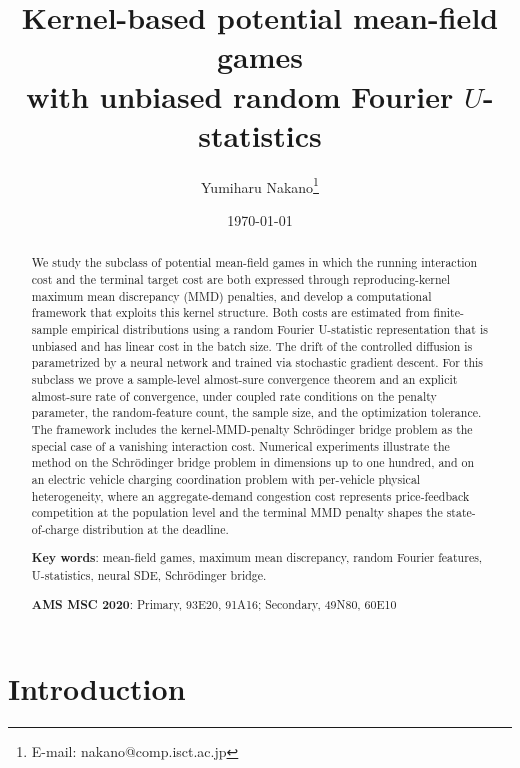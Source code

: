 \documentclass[11pt,leqno]{article}
\title{Kernel-based potential mean-field games \\ with unbiased random Fourier $U$-statistics}
\author[1]{Yumiharu Nakano\thanks{E-mail: nakano@comp.isct.ac.jp}}
\affil[1]{Department of Mathematical and Computing Science,
            Institute of Science Tokyo}
\date{\today}
\theoremstyle{plain}
\theoremstyle{remark}
\theoremstyle{definition}
\numberwithin{equation}{section}
\numberwithin{figure}{section}
\numberwithin{table}{section}
\numberwithin{algorithm}{section}
\begin{document}
\maketitle

\begin{abstract}
We study the subclass of potential mean-field games
in which the running interaction cost and the terminal target cost are both expressed
through reproducing-kernel maximum mean discrepancy (MMD) penalties,
and develop a computational framework that exploits this kernel structure.
Both costs are estimated from finite-sample empirical distributions
using a random Fourier U-statistic representation that is unbiased
and has linear cost in the batch size.
The drift of the controlled diffusion is parametrized by a neural network
and trained via stochastic gradient descent.
For this subclass we prove a sample-level almost-sure convergence theorem
and an explicit almost-sure rate of convergence,
under coupled rate conditions on the penalty parameter, the random-feature count, the sample size,
and the optimization tolerance.
The framework includes the kernel-MMD-penalty Schr{\"o}dinger bridge problem
as the special case of a vanishing interaction cost.
Numerical experiments illustrate the method on the Schr{\"o}dinger bridge problem
in dimensions up to one hundred,
and on an electric vehicle charging coordination problem with per-vehicle physical heterogeneity,
where an aggregate-demand congestion cost represents price-feedback competition at the population level
and the terminal MMD penalty shapes the state-of-charge distribution at the deadline.

\begin{flushleft}
{\bf Key words}: mean-field games, maximum mean discrepancy, random Fourier features, U-statistics, neural SDE, Schr{\"o}dinger bridge.
\end{flushleft}
\begin{flushleft}
{\bf AMS MSC 2020}:
Primary, 93E20, 91A16; Secondary, 49N80, 60E10
\end{flushleft}
\end{abstract}


\section{Introduction}\label{sec:1}
\end{document}
